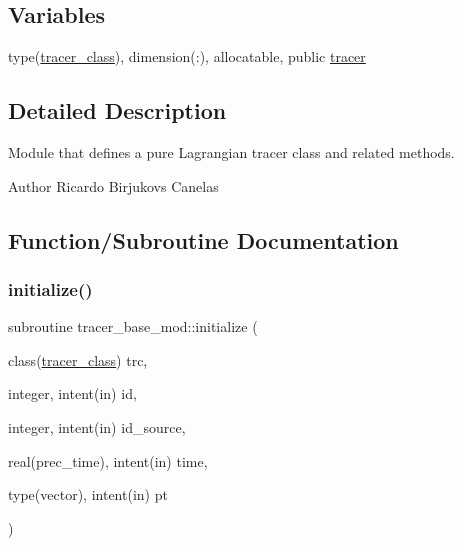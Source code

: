 \subsection*{Variables}
\begin{DoxyCompactItemize}
\item 
type(\mbox{\hyperlink{structtracer__base__mod_1_1tracer__class}{tracer\+\_\+class}}), dimension(\+:), allocatable, public \mbox{\hyperlink{namespacetracer__base__mod_a8e683639ef8cd4f4bdcff33fffe21fc2}{tracer}}
\end{DoxyCompactItemize}


\subsection{Detailed Description}
Module that defines a pure Lagrangian tracer class and related methods. 

\begin{DoxyAuthor}{Author}
Ricardo Birjukovs Canelas 
\end{DoxyAuthor}


\subsection{Function/\+Subroutine Documentation}
\mbox{\label{namespacetracer__base__mod_ae73e3d1fd8818cf3e1a8593aafebea43}} 
\subsubsection{\texorpdfstring{initialize()}{initialize()}}
{\footnotesize\ttfamily subroutine tracer\+\_\+base\+\_\+mod\+::initialize (\begin{DoxyParamCaption}\item[{class(\mbox{\hyperlink{structtracer__base__mod_1_1tracer__class}{tracer\+\_\+class}})}]{trc,  }\item[{integer, intent(in)}]{id,  }\item[{integer, intent(in)}]{id\+\_\+source,  }\item[{real(prec\+\_\+time), intent(in)}]{time,  }\item[{type(vector), intent(in)}]{pt }\end{DoxyParamCaption})\hspace{0.3cm}{\ttfamily [private]}}



